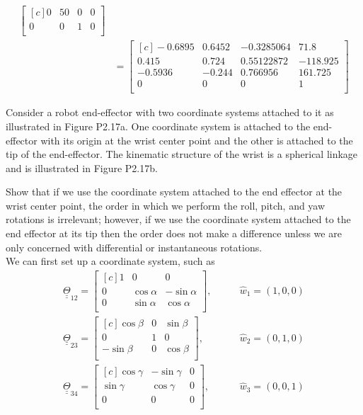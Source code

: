 \documentclass[onecolumn,10pt]{jhwhw}
\def\du#1{\underline{\underline{#1}}}
\begin{document}
\begin{align*}
\begin{bmatrix*}[c]
0    & 50  & 0  & 0    \\
0    & 0   & 1  & 0    \\
\end{bmatrix*} \\
&=
\begin{bmatrix*}[c]
-0.6895    &    0.6452    &   -0.3285064 &   71.8   \\
 0.415     &    0.724     &    0.55122872& -118.925 \\
-0.5936    &   -0.244     &    0.766956  &  161.725 \\
 0         &    0         &    0         &    1     \\
\end{bmatrix*}
\end{align*}

\clearpage

\problem{}
Consider a robot end-effector with two coordinate systems attached to it as illustrated in Figure P2.17a. One coordinate system is attached to the end-effector with its origin at the wrist center point and the other is attached to the tip of the end-effector. The kinematic structure of the wrist is a spherical linkage and is illustrated in Figure P2.17b.

Show that if we use the coordinate system attached to the end effector at the wrist center point, the order in which we perform the roll, pitch, and yaw rotations is irrelevant; however, if we use the coordinate system attached to the end effector at its tip then the order does not make a difference unless we are only concerned with differential or instantaneous rotations. \\

We can first set up a coordinate system, such as
\begin{align*}
\du{\Theta}_{12} =
\begin{bmatrix*}[c]
1 & 0 & 0 \\
0 & \cos \alpha & - \sin \alpha \\
0 & \sin \alpha & \cos \alpha \\
\end{bmatrix*},
\hspace{2em}&\hat{w}_1 = \left ( 1, 0, 0 \right ) \\
\du{\Theta}_{23} =
\begin{bmatrix*}[c]
\cos \beta & 0 & \sin \beta \\
0 & 1 & 0 \\
-\sin \beta & 0 & \cos \beta \\
\end{bmatrix*},
\hspace{2em}&\hat{w}_2 = \left ( 0, 1, 0 \right ) \\
\du{\Theta}_{34} =
\begin{bmatrix*}[c]
\cos \gamma & - \sin \gamma & 0 \\
\sin \gamma & \cos \gamma & 0 \\
0 & 0 & 0\\
\end{bmatrix*},
\hspace{2em}&\hat{w}_3 = \left ( 0, 0, 1 \right )
\end{align*}
\end{document}
